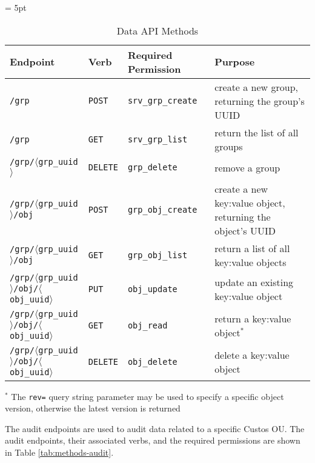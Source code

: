 \begin{table}[!tbh]
  \vspace{1ex}
  \begin{center}
    \tabulinesep = 5pt
    \begin{tabu} to \textwidth
      { | X[2.5,l,m]
        | X[.5,l,m]
        | X[1,l,m]
        | X[1,l,m]
        | }
      \hline
      \textbf{Endpoint}
      & \textbf{Verb}
      & \textbf{Required Permission}
      & \textbf{Purpose}
      \\ \hline
      \texttt{/grp}
      & \texttt{POST} & \texttt{srv\_grp\_create}
      & create a new group, returning the group's UUID
      \\ \hline
      \texttt{/grp}
      & \texttt{GET} & \texttt{srv\_grp\_list}
      & return the list of all groups
      \\ \hline
      \texttt{/grp/$\langle$grp\_uuid$\rangle$}
      & \texttt{DELETE} & \texttt{grp\_delete}
      & remove a group
      \\ \hline
      \texttt{/grp/$\langle$grp\_uuid$\rangle$/obj}
      & \texttt{POST} & \texttt{grp\_obj\_create}
      & create a new key:value object, returning the object's UUID
      \\ \hline
      \texttt{/grp/$\langle$grp\_uuid$\rangle$/obj}
      & \texttt{GET} & \texttt{grp\_obj\_list}
      & return a list of all key:value objects
      \\ \hline
      \texttt{/grp/$\langle$grp\_uuid$\rangle$/obj/$\langle$obj\_uuid$\rangle$}
      & \texttt{PUT} & \texttt{obj\_update}
      & update an existing key:value object
      \\ \hline
      \texttt{/grp/$\langle$grp\_uuid$\rangle$/obj/$\langle$obj\_uuid$\rangle$}
      & \texttt{GET} & \texttt{obj\_read}
      & return a key:value object$^{\ast}$
      \\ \hline
      \texttt{/grp/$\langle$grp\_uuid$\rangle$/obj/$\langle$obj\_uuid$\rangle$}
      & \texttt{DELETE} & \texttt{obj\_delete}
      & delete a key:value object
      \\ \hline
    \end{tabu}
  \end{center}
  \caption{Data API Methods}
  \label{tab:methods-data}
  ${}^\ast$ The \texttt{rev=} query string parameter may be used to
  specify a specific object version, otherwise the latest version is
  returned
\end{table}

The audit endpoints are used to audit data related to a specific
Custos OU. The audit endpoints, their associated verbs, and the
required permissions are shown in Table \ref{tab:methods-audit}.

